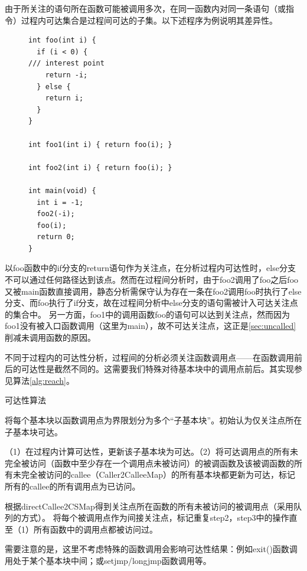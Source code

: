 由于所关注的语句所在函数可能被调用多次，在同一函数内对同一条语句（或指令）过程内可达集合是过程间可达的子集。以下述程序为例说明其差异性。

\begin{figure}[t]
\begin{center}
\begin{lstlisting}[language={[ANSI]C}]
int foo(int i) {
  if (i < 0) {   
/// interest point
    return -i;
  } else {
    return i;
  }
}

int foo1(int i) { return foo(i); }

int foo2(int i) { return foo(i); }

int main(void) {
  int i = -1;
  foo2(-i);
  foo(i);
  return 0;
}
\end{lstlisting}
\end{center}
\end{figure}
以foo函数中的if分支的return语句作为关注点，在分析过程内可达性时，else分支不可以通过任何路径达到该点。然而在过程间分析时，由于foo2调用了foo之后foo又被main函数直接调用，静态分析需保守认为存在一条在foo2调用foo时执行了else分支、而foo执行了if分支，故在过程间分析中else分支的语句需被计入可达关注点的集合中。 另一方面，foo1中的调用函数foo的语句可以达到关注点，然而因为foo1没有被入口函数调用（这里为main），故不可达关注点，这正是\autoref{sec:uncalled}削减未调用函数的原因。

不同于过程内的可达性分析，过程间的分析必须关注函数调用点——在函数调用前后的可达性是截然不同的。这需要我们特殊对待基本块中的调用点前后。其实现参见算法\ref{alg:reach}。

\begin{algorithm}\label{alg:reach}
\caption{可达性算法}
\SetAlgoNoLine

将每个基本块以函数调用点为界限划分为多个“子基本块”。初始认为仅关注点所在子基本块可达。

（1）在过程内计算可达性，更新该子基本块为可达。（2）将可达调用点的所有未完全被访问（函数中至少存在一个调用点未被访问）的被调函数及该被调函数的所有未完全被访问的callee（Caller2CalleeMap）的所有基本块都更新为可达，标记所有的callee的所有调用点为已访问。

根据directCallee2CSMap得到关注点所在函数的所有未被访问的被调用点（采用队列的方式）。
将每个被调用点作为间接关注点，标记重复step2，step3中的操作直至（1）所有函数中的调用点都被访问过。
\end{algorithm}

需要注意的是，这里不考虑特殊的函数调用会影响可达性结果：例如exit()函数调用处于某个基本块中间；或setjmp/longjmp函数调用等。

